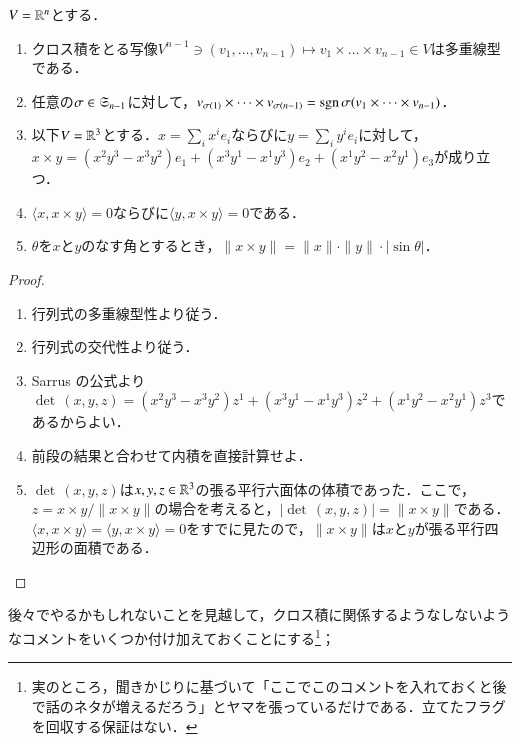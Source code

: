 \begin{prop}[クロス積の基本性質]$V = \mathbb{R}^n$とする．
\begin{enumerate}
\item クロス積をとる写像$V^{n-1} \ni (v_1, \dots, v_{n-1}) \mapsto v_1 \times \dots \times v_{n-1} \in V$は多重線型である．
\item 任意の$\sigma \in \mathfrak{S}_{n-1}$に対して，$v_{\sigma(1)} \times \dots \times v_{\sigma(n-1)} = \operatorname{sgn} \sigma (v_1 \times \dots \times v_{n-1})$．
\item 以下$V=\mathbb{R}^3$とする．$x = \sum_i x^i e_i$ならびに$y = \sum_i y^i e_i$に対して，$x \times y = (x^2y^3 - x^3y^2)e_1 + (x^3y^1 - x^1y^3)e_2 + (x^1y^2 - x^2y^1)e_3$が成り立つ．
\item $\langle x, x \times y \rangle = 0$ならびに$\langle y, x \times y \rangle = 0$である．
\item $\theta$を$x$と$y$のなす角とするとき，$\|x \times y\| = \|x\| \cdot \|y\| \cdot \lvert \sin \theta \rvert$．
\end{enumerate}
\end{prop}

\begin{proof}
\leavevmode
\begin{enumerate}
\item 行列式の多重線型性より従う．
\item 行列式の交代性より従う．
\item Sarrus の公式より$\det \, (x,y,z) = (x^2y^3 - x^3y^2)z^1 + (x^3y^1 - x^1y^3)z^2 + (x^1y^2 - x^2y^1)z^3$であるからよい．
\item 前段の結果と合わせて内積を直接計算せよ．
\item $\det \, (x,y,z)$は$x,y,z \in \mathbb{R}^3$の張る平行六面体の体積であった．ここで，$z = x \times y / \| x \times y \|$の場合を考えると，$\lvert \det \, (x,y,z) \rvert = \|x \times y\|$である．$\langle x, x \times y \rangle = \langle y, x \times y \rangle = 0$をすでに見たので，$\|x \times y\|$は$x$と$y$が張る平行四辺形の面積である．
\end{enumerate}
\end{proof}

後々でやるかもしれないことを見越して，クロス積に関係するようなしないようなコメントをいくつか付け加えておくことにする\footnote{実のところ，聞きかじりに基づいて「ここでこのコメントを入れておくと後で話のネタが増えるだろう」とヤマを張っているだけである．立てたフラグを回収する保証はない．}；


